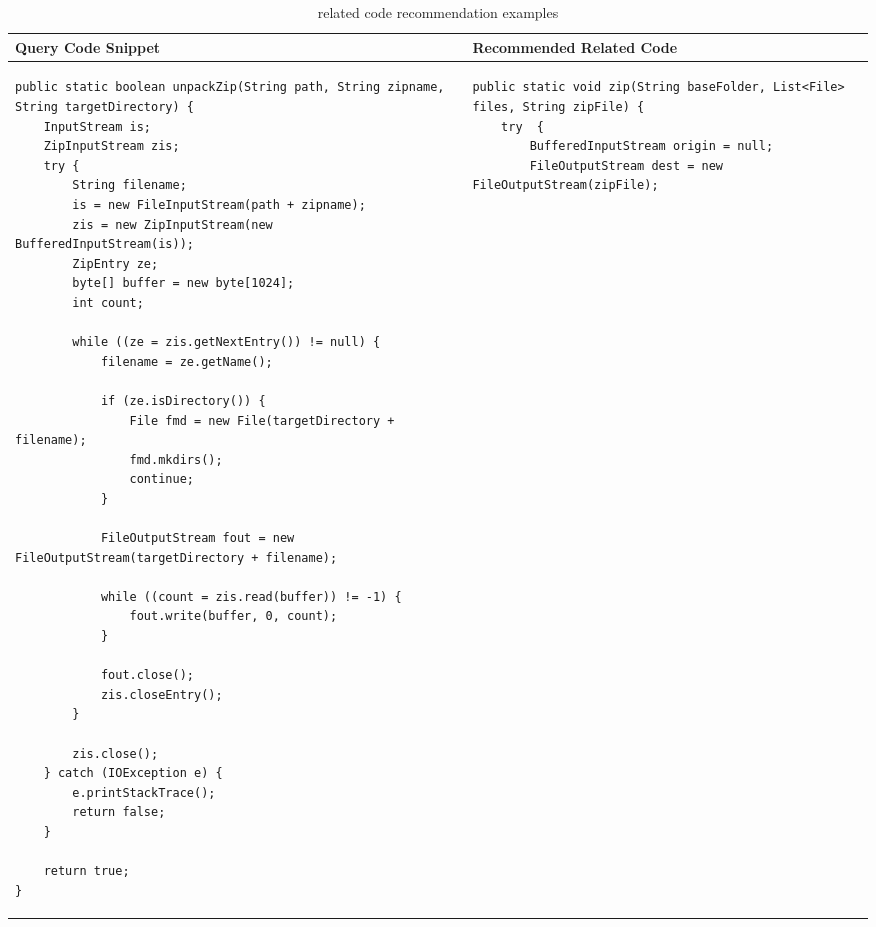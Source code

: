 \lstset{
	frame=none,
    aboveskip=0pt,
    belowskip=0pt,
    basicstyle=\tiny\ttfamily,
}
\begin{table*}\scriptsize
\caption{related code recommendation examples}
\label{tab:intro-examples}

\setlength{\tabcolsep}{0.01\textwidth}
\begin{tabular}{@{}p{}p{}@{}}
\toprule
Query Code Snippet & Recommended Related Code \\
\midrule



\begin{lstlisting}
public static boolean unpackZip(String path, String zipname, String targetDirectory) {
	InputStream is;
	ZipInputStream zis;
	try {
		String filename;
		is = new FileInputStream(path + zipname);
		zis = new ZipInputStream(new BufferedInputStream(is));
		ZipEntry ze;
		byte[] buffer = new byte[1024];
		int count;

		while ((ze = zis.getNextEntry()) != null) {
			filename = ze.getName();

			if (ze.isDirectory()) {
				File fmd = new File(targetDirectory + filename);
				fmd.mkdirs();
				continue;
			}

			FileOutputStream fout = new FileOutputStream(targetDirectory + filename);

			while ((count = zis.read(buffer)) != -1) {
				fout.write(buffer, 0, count);
			}

			fout.close();
			zis.closeEntry();
		}

		zis.close();
	} catch (IOException e) {
		e.printStackTrace();
		return false;
	}

	return true;
}
\end{lstlisting}

&
\begin{lstlisting}
public static void zip(String baseFolder, List<File> files, String zipFile) {
	try  {
		BufferedInputStream origin = null;
		FileOutputStream dest = new FileOutputStream(zipFile);


\end{lstlisting}
\end{tabular}
\end{table*}
